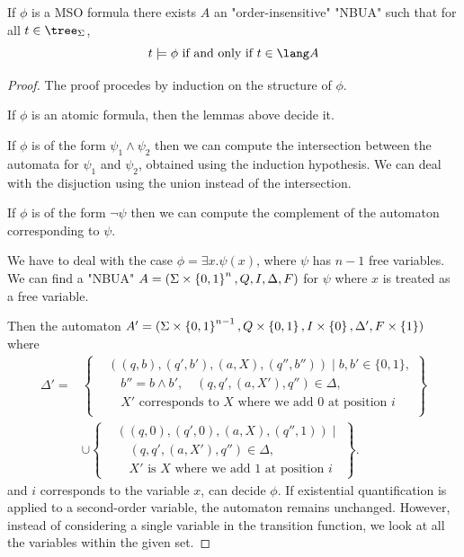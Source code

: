 \documentclass[twoside]{article}
\begin{document}
\begin{lemma} \label{lem:MSO-aut}
	If $\phi$ is a MSO formula there exists $A$ an "order-insensitive" "NBUA" such that for all $t \in \tree_{\Sigma}$,
	\[ t \models \phi \tiff t \in \lang A \]
\end{lemma}


\begin{proof}
	The proof procedes by induction on the structure of $\phi$.

	If $\phi$ is an atomic formula, then the lemmas above decide it.

	If $\phi$ is of the form $\psi_1 \land \psi_2$ then we can compute the intersection between the automata
	for $\psi_1$ and $\psi_2$, obtained using the induction hypothesis. We can deal with the disjuction using the
	union instead of the intersection.

	If $\phi$ is of the form $\lnot \psi$ then we can compute the complement of the automaton corresponding to $\psi$.

	We have to deal with the case $\phi = \exists x.\psi(x)$, where $\psi$ has $n-1$ free variables. We can find a "NBUA" $A = (\Sigma \times \left\{0,1\right\}^n, Q, I, \Delta, F)$
	for $\psi$ where $x$ is treated as a free variable.

	Then the automaton $A' = (\Sigma \times \left\{0,1\right\}^{n-1}, Q \times \left\{0,1\right\}, I \times \left\{0\right\}, \Delta', F \times \left\{1\right\})$ where
	\[
		\begin{aligned}
			\Delta' = & \left\{
			\begin{aligned}
				 & ((q,b), (q', b'), (a, X), (q'',b'')) \mid b, b' \in \{0,1\},               \\
				 & \quad b'' = b \land b', \quad (q, q', (a, X'), q'') \in \Delta,            \\
				 & \quad X' \text{ corresponds to $X$ where we add } 0 \text{ at position } i \\
			\end{aligned}
			\right\}                 \\
			          & \cup \left\{
			\begin{aligned}
				 & ((q,0), (q', 0), (a, X), (q'',1)) \mid                         \\
				 & \quad (q, q', (a, X'), q'') \in \Delta,                        \\
				 & \quad X' \text{ is $X$ where we add } 1 \text{ at position } i
			\end{aligned}
			\right\}.
		\end{aligned}
	\]
	and $i$ corresponds to the variable $x$, can decide $\phi$. If existential quantification is applied to a
	second-order variable, the automaton remains unchanged. However, instead of considering a single variable
	in the transition function, we look at all the variables within the given set.
\end{proof}
\end{document}

